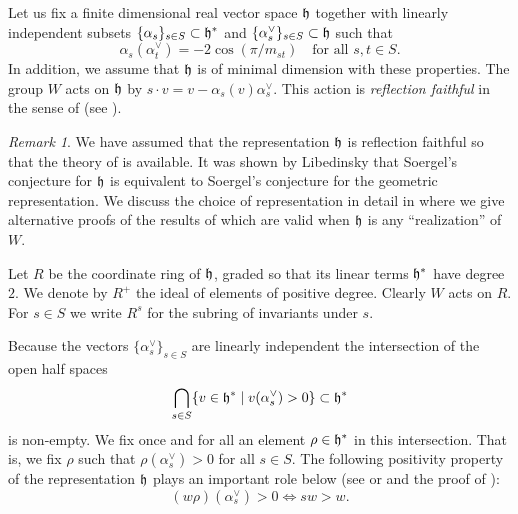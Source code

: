 \documentclass[11pt]{amsart}
\numberwithin{equation}{section}
\def\a{\alpha}
\theoremstyle{definition}
\theoremstyle{remark}
\newtheorem{remark}[thm]{Remark}
\begin{document}
Let us fix a finite dimensional real vector space ${\mathfrak h}$ together with linearly independent subsets $\{ \a_s \}_{s \in S} \subset \hg^*$ and $\{ \a_s^\vee \}_{s \in S} \subset \hg$ such
that
\[ \a_s(\alpha_t^\vee) = -2 \cos(\pi/m_{st}) \quad \text{for all $s, t
  \in S$.} \]
In addition, we assume that ${\mathfrak h}$ is of minimal
  dimension with these properties.
The group $W$ acts on ${\mathfrak h}$ by $s \cdot v = v -
\alpha_s(v)\alpha_s^\vee$. This action is \emph{reflection faithful}
in the sense of \cite[Definition 1.5]{S3} (see \cite[Proposition 2.1]{S3}).


\begin{remark} We have assumed that the representation ${\mathfrak h}$ is
  reflection faithful so that the theory of \cite{S3} is available. It
  was shown by Libedinsky \cite{Li} that Soergel's conjecture for
  ${\mathfrak h}$ is equivalent to Soergel's conjecture for the geometric
  representation. We discuss the choice of representation in detail in
  \cite{EW2} where we give alternative proofs of the results of
  \cite{S3} which are valid when ${\mathfrak h}$ is any ``realization'' of $W$.
\end{remark}

Let $R$ be the coordinate ring of ${\mathfrak h}$, graded so that its
linear terms ${\mathfrak h}^*$ have degree $2$. We denote by $R^+$ the ideal
of elements of positive degree.
Clearly $W$ acts on $R$. For $s \in S$ we write $R^s$ for the
subring of invariants under $s$.

Because the vectors $\{ \alpha_s^\vee \}_{s \in S}$ are linearly
independent the intersection of the open half spaces
\[ \bigcap_{s \in S}
\{ v \in {\mathfrak h}^* \; | \; v(\alpha_s^\vee) >
0\} \subset {\mathfrak h}^*\]is non-empty.
We fix once and for all an
element $\rho \in {\mathfrak h}^*$ in this intersection. That is, we fix $\rho$
such that $\rho(\alpha_s^\vee) >
0$ for all $ s\in S$.
The following positivity property of the representation ${\mathfrak h}$
plays an important role below (see \cite[V.4.3]{Bo} or \cite[Lemma
5.13]{Hu} and the proof of \cite[Proposition 2.1]{S3}):
\begin{equation} \label{eq:pos}
(w\rho)(\alpha_s^{\vee}) > 0 \Leftrightarrow sw > w.
\end{equation}

\end{document}
